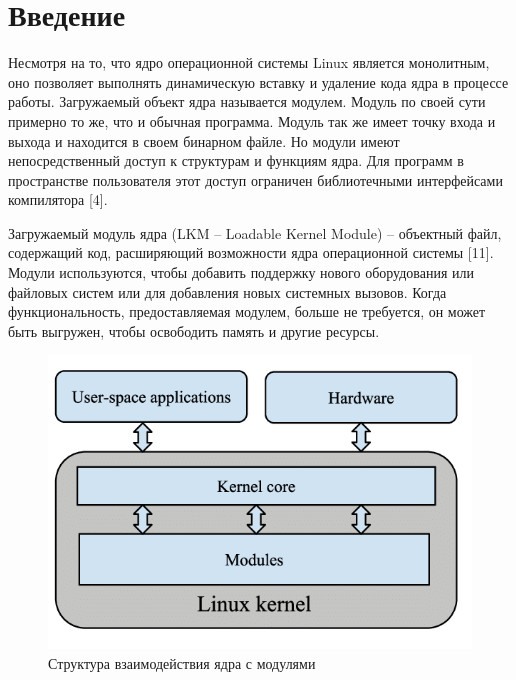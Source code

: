





\tableofcontents
\newpage




\section{Введение}

Несмотря на то, что ядро операционной системы Linux является монолитным, оно позволяет выполнять динамическую вставку и удаление кода ядра в процессе работы. Загружаемый объект ядра называется модулем. Модуль по своей сути примерно то же, что и обычная программа. Модуль так же имеет точку входа и выхода и находится в своем бинарном файле. Но модули имеют непосредственный доступ к структурам и функциям ядра. Для программ в пространстве пользователя этот доступ ограничен библиотечными интерфейсами компилятора [4].

Загружаемый модуль ядра (LKM -- Loadable Kernel Module) -- объектный файл, содержащий код, расширяющий возможности ядра операционной системы [11]. Модули используются, чтобы добавить поддержку нового оборудования или файловых систем или для добавления новых системных вызовов. Когда функциональность, предоставляемая модулем, больше не требуется, он может быть выгружен, чтобы освободить память и другие ресурсы.

\begin{figure}[H]
	\centering
	\includegraphics[width=0.6\linewidth]{module}
	\caption{Структура взаимодействия ядра с модулями}
\end{figure}

